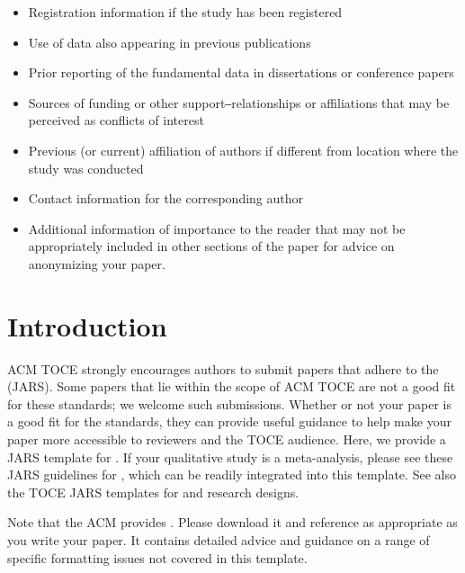 \documentclass[acmsmall]{acmart}
\begin{document}
\begin{itemize}
    \item Registration information if the study has been registered
    \item Use of data also appearing in previous publications
    \item Prior reporting of the fundamental data in dissertations or conference papers
    \item Sources of funding or other support‒relationships or affiliations that may be perceived as conflicts of interest
    \item Previous (or current) affiliation of authors if different from location where the study  was conducted
    \item Contact information for the corresponding author
    \item Additional information of importance to the reader that may not be appropriately included in other sections of the paper
    \hyperlink{https://dl.acm.org/journal/toce/author-guidelines}{\color{blue}{TOCE’s Author Guidelines page}} for advice on anonymizing your paper.
\end{itemize}

\section{Introduction}

ACM TOCE strongly encourages authors to submit papers that adhere to the \hyperlink{https://apastyle.apa.org/jars/}{\color{blue}{American Psychological Association’s Journal Article Reporting Standards}}  (JARS).  Some papers that lie within the scope of ACM TOCE are not a good fit for these standards; we welcome such submissions. Whether or not your paper is a good fit for the standards, they can provide useful guidance to help make your paper more accessible to reviewers and the TOCE audience.
Here, we provide a JARS template for \hyperlink{https://apastyle.apa.org/jars/quant-table-1.pdf}{\color{blue}{general qualitative research designs}}. If your qualitative study is a meta-analysis, please see these JARS guidelines for \hyperlink{https://apastyle.apa.org/jars/qual-table-2.pdf}{\color{blue}{qualitative meta-analyses}}, which can be readily integrated into this template. See also the TOCE JARS templates for \hyperlink{https://apastyle.apa.org/jars/quantitative}{\color{blue}{quantitative}} and \hyperlink{https://apastyle.apa.org/jars/mixed-methods}{\color{blue}{mixed}} research designs.

Note that the ACM provides   \hyperlink{https://www.acm.org/binaries/content/assets/publications/consolidated-tex-template/acmart-master.zip}{\color{blue}{an article templates for LateX}}. Please download it and reference as appropriate as you write your paper. It contains detailed advice and guidance on a range of specific formatting issues not covered in this template.
\end{document}
